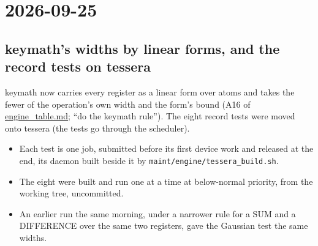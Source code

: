 \section{\texorpdfstring{2026-09-25}{2026-09-25}}

\subsection{\texorpdfstring{keymath's widths by linear forms, and the record tests on tessera}{keymath's widths by linear forms, and the record tests on tessera}}

keymath now carries every register as a linear form over atoms and takes the fewer of the operation's own width and the form's bound (A16 of \hyperref[chap:engine-table]{engine\_\allowbreak{}table.md}; “do the keymath rule”). The eight record tests were moved onto tessera (the tests go through the scheduler).

\begin{itemize}
\item Each test is one job, submitted before its first device work and released at the end, its daemon built beside it by \texttt{maint/\allowbreak{}engine/\allowbreak{}tessera\_\allowbreak{}build.\allowbreak{}sh}.
\item The eight were built and run one at a time at below-normal priority, from the working tree, uncommitted.
\item An earlier run the same morning, under a narrower rule for a SUM and a DIFFERENCE over the same two registers, gave the Gaussian test the same widths.
\end{itemize}

